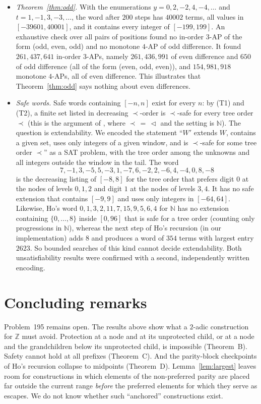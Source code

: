 \documentclass[11pt]{amsart}
\theoremstyle{definition}
\theoremstyle{remark}
\newcommand{\Z}{\mathbb{Z}}
\newcommand{\N}{\mathbb{N}}
\begin{document}
\begin{itemize}[leftmargin=*]
\item \emph{Theorem~\ref{thm:odd}.} With the enumerations $y=0,2,-2,4,-4,\dots$ and $t=1,-1,3,-3,\dots$, the word after $200$ steps has $40002$ terms, all values in $[-39601,40001]$, and it contains every integer of $[-199,199]$. An exhaustive check over all pairs of positions found no in-order $3$-AP of the form (odd, even, odd) and no monotone $4$-AP of odd difference. It found $261{,}437{,}641$ in-order $3$-APs, namely $261{,}436{,}991$ of even difference and $650$ of odd difference (all of the form (even, odd, even)), and $154{,}981{,}918$ monotone $4$-APs, all of even difference. This illustrates that Theorem~\ref{thm:odd} says nothing about even differences.
\item \emph{Safe words.} Safe words containing $[-n,n]$ exist for every $n$: by (T1) and (T2), a finite set listed in decreasing $\prec$-order is $\prec$-safe for every tree order $\prec$ (this is the argument of \cite[Lemma~1]{Ho26}, where $\prec\,=\,\lhd$ and the setting is $\N$). The question is extendability. We encoded the statement ``$W'$ extends $W$, contains a given set, uses only integers of a given window, and is $\prec$-safe for some tree order $\prec$'' as a SAT problem, with the tree order among the unknowns and all integers outside the window in the tail. The word
\[
7,-1,3,-5,5,-3,1,-7,6,-2,2,-6,4,-4,0,8,-8
\]
is the decreasing listing of $[-8,8]$ for the tree order that prefers digit $0$ at the nodes of levels $0,1,2$ and digit $1$ at the nodes of levels $3,4$. It has no safe extension that contains $[-9,9]$ and uses only integers in $[-64,64]$. Likewise, Ho's word $0,1,3,2,11,7,15,9,5,6,4$ for $\N$ has no extension containing $\{0,\dots,8\}$ inside $[0,96]$ that is safe for a tree order (counting only progressions in $\N$), whereas the next step of Ho's recursion (in our implementation) adds $8$ and produces a word of $354$ terms with largest entry $2623$. So bounded searches of this kind cannot decide extendability. Both unsatisfiability results were confirmed with a second, independently written encoding.
\end{itemize}

\section{Concluding remarks}

Problem~195 remains open. The results above show what a $2$-adic construction for $\Z$ must avoid. Protection at a node and at its unprotected child, or at a node and the grandchildren below its unprotected child, is impossible (Theorem~B). Safety cannot hold at all prefixes (Theorem~C). And the parity-block checkpoints of Ho's recursion collapse to midpoints (Theorem~D). Lemma~\ref{lem:largest} leaves room for constructions in which elements of the non-preferred parity are placed far outside the current range \emph{before} the preferred elements for which they serve as escapes. We do not know whether such ``anchored'' constructions exist.
\end{document}
